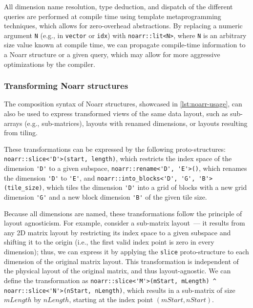 All dimension name resolution, type deduction, and dispatch of the different queries are performed at compile time using \cpp template metaprogramming techniques, which allows for zero-overhead abstractions. By replacing a numeric argument \lstinline{N} (e.g., in \lstinline{vector} or \lstinline{idx}) with \lstinline{noarr::lit<N>}, where \lstinline{N} is an arbitrary size value known at compile time, we can propagate compile-time information to a Noarr structure or a given query, which may allow for more aggressive optimizations by the compiler.

\subsubsection{Transforming Noarr structures}\label{sec:transforming-noarr-structures}

The composition syntax of Noarr structures, showcased in \cref{lst:noarr-usage}, can also be used to express transformed views of the same data layout, such as sub-arrays (e.g., sub-matrices), layouts with renamed dimensions, or layouts resulting from tiling.

These transformations can be expressed by the following proto-structures: \lstinline{noarr::slice<'D'>(start, length)}, which restricts the index space of the dimension \lstinline{'D'} to a given subspace, \lstinline{noarr::rename<'D', 'E'>()}, which renames the dimension \lstinline{'D'} to \lstinline{'E'}, and \lstinline{noarr::into_blocks<'D', 'G', 'B'>(tile_size)}, which tiles the dimension \lstinline{'D'} into a grid of blocks with a new grid dimension \lstinline{'G'} and a new block dimension \lstinline{'B'} of the given tile size.

Because all dimensions are named, these transformations follow the principle of layout agnosticism. For example, consider a sub-matrix layout~--- it results from any 2D matrix layout by restricting its index space to a given subspace and shifting it to the origin (i.e., the first valid index point is zero in every dimension); thus, we can express it by applying the \lstinline{slice} proto-structure to each dimension of the original matrix layout. This transformation is independent of the physical layout of the original matrix, and thus layout-agnostic. We can define the transformation as \lstinline{noarr::slice<'M'>(mStart, mLength) ^ noarr::slice<'N'>(nStart, nLength)}, which results in a sub-matrix of size $mLength$ by $nLength$, starting at the index point $(mStart, nStart)$.

